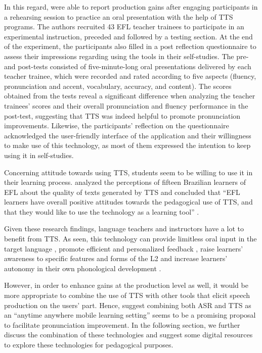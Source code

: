 \documentclass[english]{textolivre}
\begin{document}
In this regard, \textcite{eksi_investigation_2016} were able to report production gains after engaging participants in a rehearsing session to practice an oral presentation with the help of TTS programs. The authors recruited 43 EFL teacher trainees to participate in an experimental instruction, preceded and followed by a testing section. At the end of the experiment, the participants also filled in a post reflection questionnaire to assess their impressions regarding using the tools in their self-studies. The pre- and post-tests consisted of five-minute-long oral presentations delivered by each teacher trainee, which were recorded and rated according to five aspects (fluency, pronunciation and accent, vocabulary, accuracy, and content). The scores obtained from the tests reveal a significant difference when analyzing the teacher trainees’ scores and their overall pronunciation and fluency performance in the post-test, suggesting that TTS was indeed helpful to promote pronunciation improvements. Likewise, the participants’ reflection on the questionnaire acknowledged the user-friendly interface of the application and their willingness to make use of this technology, as most of them expressed the intention to keep using it in self-studies.

Concerning attitude towards using TTS, students seem to be willing to use it in their learning process. \textcite{bione_2016} analyzed the perceptions of fifteen Brazilian learners of EFL about the quality of texts generated by TTS and concluded that “EFL learners have overall positive attitudes towards the pedagogical use of TTS, and that they would like to use the technology as a learning tool” \cite[p. 50]{bione_2016}.

Given these research findings, language teachers and instructors have a lot to benefit from TTS. As seen, this technology can provide limitless oral input in the target language \cite{cardoso_evaluating_2015}, promote efficient and personalized feedback \cite{cardoso_2018}, raise learners’ awareness to specific features and forms of the L2 \cite{liakin_mobilizing_2017, gomes_can_2018, cardoso_2018} and increase learners’ autonomy in their own phonological development \cite{moon_2012, liakin_mobilizing_2017}.

However, in order to enhance gains at the production level as well, it would be more appropriate to combine the use of TTS with other tools that elicit speech production on the users’ part. Hence, \textcite{liakin_mobilizing_2017} suggest combining both ASR and TTS as an “anytime anywhere mobile learning setting” seems to be a promising proposal to facilitate pronunciation improvement. In the following section, we further discuss the combination of these technologies and suggest some digital resources to explore these technologies for pedagogical purposes.
\end{document}
